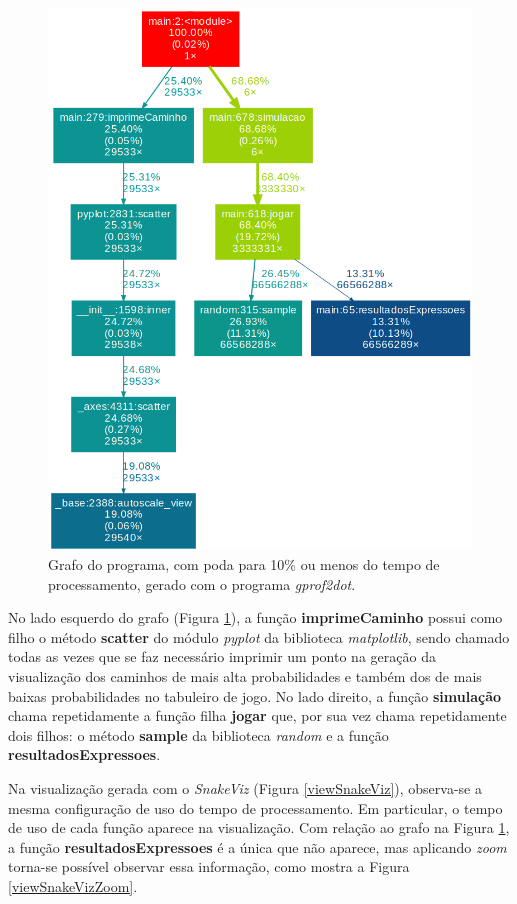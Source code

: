 \documentclass[12pt]{article}
\begin{document}
\begin{figure}[ht]
	\centering
	\includegraphics[width=0.7\linewidth]{img/grafo.png}
	\caption{Grafo do programa, com poda para 10\% ou menos do tempo de processamento, gerado com o programa \textit{gprof2dot}.}
	\label{grafo:10}
\end{figure}

No lado esquerdo do grafo (Figura \ref{grafo:10}), a função \textbf{imprimeCaminho} possui como filho o método \textbf{scatter} do módulo \textit{pyplot} da biblioteca \textit{matplotlib}, sendo chamado todas as vezes que se faz necessário imprimir um ponto na geração da visualização dos caminhos de mais alta probabilidades e também dos de mais baixas probabilidades no tabuleiro de jogo. No lado direito, a função \textbf{simulação} chama repetidamente a função filha \textbf{jogar} que, por sua vez chama repetidamente dois filhos: o método \textbf{sample} da biblioteca \textit{random} e a função \textbf{resultadosExpressoes}.

Na visualização gerada com o \textit{SnakeViz} (Figura \ref{viewSnakeViz}), observa-se a mesma configuração de uso do tempo de processamento. Em particular, o tempo de uso de cada função aparece na visualização. Com relação ao grafo na Figura \ref{grafo:10}, a função \textbf{resultadosExpressoes} é a única que não aparece, mas aplicando \textit{zoom} torna-se possível observar essa informação, como mostra a Figura \ref{viewSnakeVizZoom}.
\end{document}
